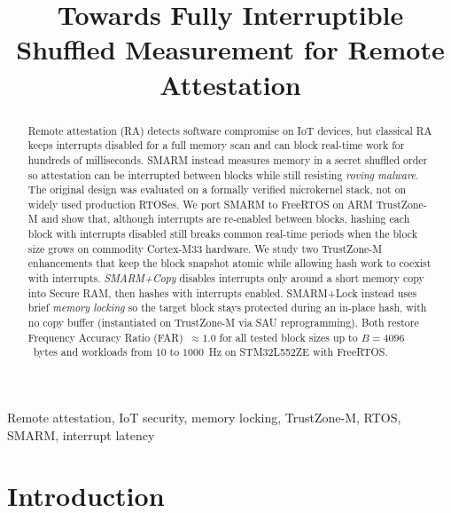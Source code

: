 \documentclass[conference]{IEEEtran}
\newcommand{\smarmcopy}{SMARM+Copy\xspace}
\newcommand{\smarmlock}{SMARM+Lock\xspace}
\begin{document}
\title{Towards Fully Interruptible Shuffled Measurement for Remote Attestation}

\author{
}

\maketitle

\begin{abstract}
Remote attestation (RA) detects software compromise on IoT devices, but
classical RA keeps interrupts disabled for a full memory scan and can
block real-time work for hundreds of milliseconds.
SMARM instead measures memory in a secret shuffled order so attestation
can be interrupted between blocks while still resisting
\emph{roving malware}.
The original design was evaluated on a formally verified microkernel
stack, not on widely used production RTOSes.
We port SMARM to FreeRTOS on ARM TrustZone-M and show that, although
interrupts are re-enabled between blocks, hashing each block with
interrupts disabled still breaks common real-time periods when the block
size grows on commodity Cortex-M33 hardware.
We study two TrustZone-M enhancements that keep the block snapshot
atomic while allowing hash work to coexist with interrupts.
\emph{\smarmcopy} disables interrupts only around a short memory copy
into Secure RAM, then hashes with interrupts enabled.
\smarmlock{} instead uses brief \emph{memory locking} so the target
block stays protected during an in-place hash, with no copy buffer
(instantiated on TrustZone-M via SAU reprogramming).
Both restore Frequency Accuracy Ratio
(FAR)~$\approx 1.0$ for all tested block sizes up to $B{=}4096$~bytes
and workloads from $10$ to $1000$~Hz on STM32L552ZE with FreeRTOS.
\end{abstract}

\begin{IEEEkeywords}
Remote attestation, IoT security, memory locking, TrustZone-M, RTOS,
SMARM, interrupt latency
\end{IEEEkeywords}

\section{Introduction}
\label{sec:intro}
\end{document}
